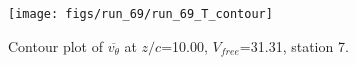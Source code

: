 \begin{figure}[H]
\centering
\texttt{[image: figs/run\_69/run\_69\_T\_contour]}
\caption{Contour plot of $\overline{v_{\theta}}$ at $z/c$=10.00, $V_{free}$=31.31, station 7.}
\label{fig:run_69_T_contour}
\end{figure}



